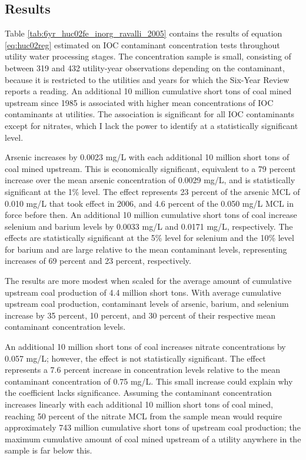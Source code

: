 \documentclass[12pt]{article}
\begin{document}
\subsection{Results}

Table \ref{tab:6yr_huc02fe_inorg_ravalli_2005} contains the results of equation \ref{eq:huc02reg} estimated on IOC contaminant concentration tests throughout utility water processing stages. The concentration sample is small, consisting of between 319 and 432 utility-year observations depending on the contaminant, because it is restricted to the utilities and years for which the Six-Year Review reports a reading. An additional 10 million cumulative short tons of coal mined upstream since 1985 is associated with higher mean concentrations of IOC contaminants at utilities. The association is significant for all IOC contaminants except for nitrates, which I lack the power to identify at a statistically significant level.

Arsenic increases by 0.0023 mg/L with each additional 10 million short tons of coal mined upstream. This is economically significant, equivalent to a 79 percent increase over the mean arsenic concentration of 0.0029 mg/L, and is statistically significant at the 1\% level. The effect represents 23 percent of the arsenic MCL of 0.010 mg/L that took effect in 2006, and 4.6 percent of the 0.050 mg/L MCL in force before then. An additional 10 million cumulative short tons of coal increase selenium and barium levels by 0.0033 mg/L and 0.0171 mg/L, respectively. The effects are statistically significant at the 5\% level for selenium and the 10\% level for barium and are large relative to the mean contaminant levels, representing increases of 69 percent and 23 percent, respectively. 

The results are more modest when scaled for the average amount of cumulative upstream coal production of 4.4 million short tons. With average cumulative upstream coal production, contaminant levels of arsenic, barium, and selenium increase by 35 percent, 10 percent, and 30 percent of their respective mean contaminant concentration levels.

An additional 10 million short tons of coal increases nitrate concentrations by 0.057 mg/L; however, the effect is not statistically significant. The effect represents a 7.6 percent increase in concentration levels relative to the mean contaminant concentration of 0.75 mg/L. This small increase could explain why the coefficient lacks significance. Assuming the contaminant concentration increases linearly with each additional 10 million short tons of coal mined, reaching 50 percent of the nitrate MCL from the sample mean would require approximately 743 million cumulative short tons of upstream coal production; the maximum cumulative amount of coal mined upstream of a utility anywhere in the sample is far below this. 
\end{document}
